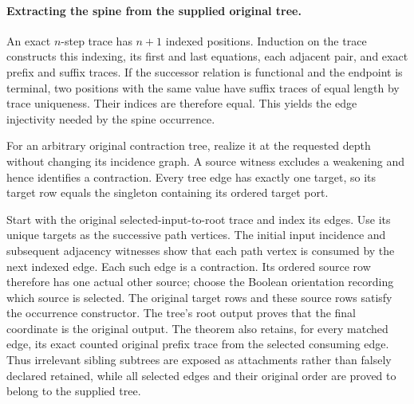 
\paragraph{Extracting the spine from the supplied original tree.}
An exact $n$-step trace has $n+1$ indexed positions. Induction on the trace
constructs this indexing, its first and last equations, each adjacent pair,
and exact prefix and suffix traces. If the successor relation is functional
and the endpoint is terminal, two positions with the same value have suffix
traces of equal length by trace uniqueness. Their indices are therefore
equal. This yields the edge injectivity needed by the spine occurrence.


For an arbitrary original contraction tree, realize it at the requested
depth without changing its incidence graph. A source witness excludes a
weakening and hence identifies a contraction. Every tree edge has exactly
one target, so its target row equals the singleton containing its ordered
target port.

Start with the original selected-input-to-root trace and index its edges.
Use its unique targets as the successive path vertices. The initial input
incidence and subsequent adjacency witnesses show that each path vertex is
consumed by the next indexed edge. Each such edge is a contraction. Its
ordered source row therefore has one actual other source; choose the Boolean
orientation recording which source is selected. The original target rows
and these source rows satisfy the occurrence constructor. The tree's root
output proves that the final coordinate is the original output. The theorem
also retains, for every matched edge, its exact counted original prefix
trace from the selected consuming edge. Thus irrelevant sibling subtrees
are exposed as attachments rather than falsely declared retained, while
all selected edges and their original order are proved to belong to the
supplied tree.



